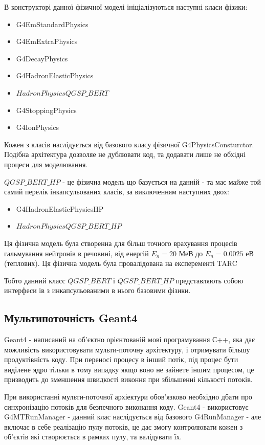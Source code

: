 \documentclass[a4paper, 14pt]{article}
\numberwithin{equation}{section}
\numberwithin{table}{section}
\begin{document}
В конструкторі данної фізичної моделі ініціалізуються наступні класи фізики: 
\begin{itemize}
	\item G4EmStandardPhysics
	\item G4EmExtraPhysics
	\item G4DecayPhysics
	\item G4HadronElasticPhysics
	\item $HadronPhysicsQGSP\_BERT$
	\item G4StoppingPhysics
	\item G4IonPhysics
\end{itemize}
Кожен з класів наслідується від базового класу фізичної G4PhysicsConsturctor. Подібна архітектура дозволяе не дублювати код, та додавати лише не обхідні процеси для моделювання.

$QGSP\_BERT\_HP$ - це фізична модель що базується на данній - та має майже той самий перелік інкапсульованих класів, за виключенням наступних двох:
\begin{itemize}
	\item G4HadronElasticPhysicsHP
	\item $HadronPhysicsQGSP\_BERT\_HP$
\end{itemize}
Ця фізична модель була створенна для більш точного врахування процесів гальмування нейтронів в речовині, від енергій $E_n = 20$ МеВ до $E_n = 0.0025$ еВ (теплових). Ця фізична модель була провалідована на експеременті TARC
 
Тобто данний класс $QGSP\_BERT$ і $QGSP\_BERT\_HP$ представляють собою интерфеси ів з инкапсульованими в нього базовими фізики.

\subsection{Мультипоточність Geant4}
Geant4 - написаний на об'єктно орієнтованій мові програмування С++, яка дає можливість використовувати мульти-поточну архітектуру, і отримувати більшу продуктівність коду. При переносі процесу в інший потік, під процес бути виділене ядро тільки в тому випадку якщо воно не зайнете іншим процесом, це призводить до зменшення швидкості виконня при збільшенні кількості потоків. 

При використанні мульти-поточної архіектури обов'язково необхідно дбати про синхронізацію потоків для безпечного виконання коду. Geant4 - використовує G4MTRunManager - данний клас наслідується від базового G4RunManager - але включає в себе реалізацію пулу потоків, це дає змогу контролювати кожен з об'єктів які створюється в рамках пулу, та валідувати їх. 
\end{document}
